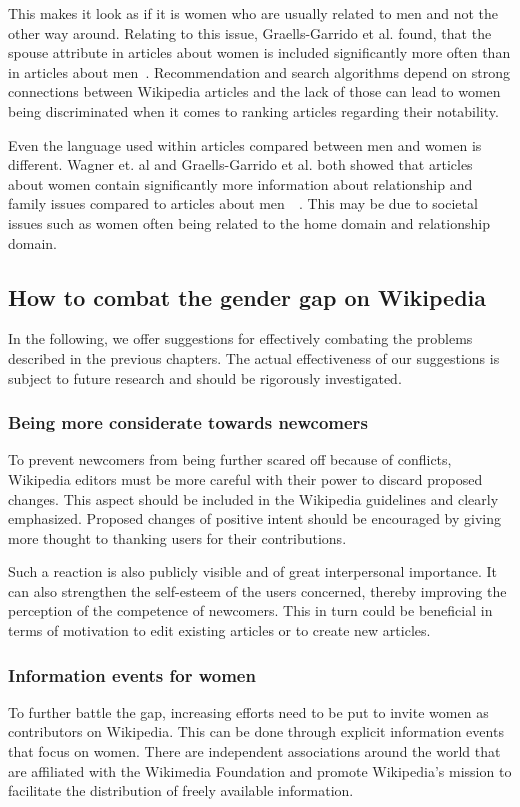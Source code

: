 \documentclass[a4paper, 11pt]{article}
\begin{document}
This makes it look as if it is women who are usually related to men and not the other way around. Relating to this issue, Graells-Garrido et al. found, that the spouse attribute in articles about women is included significantly more often than in articles about men~\cite{graells2015first}. Recommendation and search algorithms depend on strong connections between Wikipedia articles and the lack of those can lead to women being discriminated when it comes to ranking articles regarding their notability.

Even the language used within articles compared between men and women is different. Wagner et. al and Graells-Garrido et al. both showed that articles about women contain significantly more information about relationship and family issues compared to articles about men~\cite{wagner2015s}~\cite{graells2015first}. This may be due to societal issues such as women often being related to the home domain and relationship domain.

\subsection{How to combat the gender gap on Wikipedia} \label{sec:gender-gap-wikipedia:combatgap}
In the following, we offer suggestions for effectively combating the problems described in the previous chapters. The actual effectiveness of our suggestions is subject to future research and should be rigorously investigated.

\subsubsection{Being more considerate towards newcomers} \label{sec:gender-gap-wikipedia:newcomers}
To prevent newcomers from being further scared off because of conflicts, Wikipedia editors must be more careful with their power to discard proposed changes. This aspect should be included in the Wikipedia guidelines and clearly emphasized. Proposed changes of positive intent should be encouraged by giving more thought to thanking users for their contributions.

Such a reaction is also publicly visible and of great interpersonal importance. It can also strengthen the self-esteem of the users concerned, thereby improving the perception of the competence of newcomers. This in turn could be beneficial in terms of motivation to edit existing articles or to create new articles.

\subsubsection{Information events for women} \label{sec:gender-gap-wikipedia:infoevents}
To further battle the gap, increasing efforts need to be put to invite women as contributors on Wikipedia. This can be done through explicit information events that focus on women. There are independent associations around the world that are affiliated with the Wikimedia Foundation and promote Wikipedia's mission to facilitate the distribution of freely available information.
\end{document}
